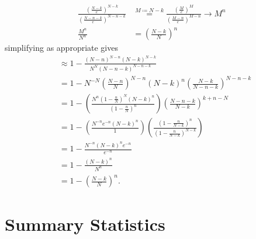\documentclass{article}
\theoremstyle{definition}
\begin{document}
\begin{align}
    \frac{\left(\frac{N-k}{e}\right)^{N-k}}{\left(\frac{N-n-k}{e}\right)^{N-n-k}}&\stackrel{M\coloneqq N-k}{=}\frac{\left(\frac{M}{e}\right)^{M}}{\left(\frac{M-n}{e}\right)^{M-n}}\to M^{n}\\
    \frac{M^{n}}{N^{n}}&=\left(\frac{N-k}{N}\right)^{n}
\end{align}
simplifying as appropriate gives
\begin{align}
    & \approx 1- \frac{\left(N-n\right)^{N-n}\left(N-k\right)^{N-k}}{N^{N}\left(N-n-k\right)^{N-n-k}}\\
    &= 1- N^{-N}\left(\frac{N-n}{N}\right)^{N-n}\left(N-k\right)^{n}\left(\frac{N-k}{N-n-k}\right)^{N-n-k}\\
    &=1-\left(\frac{N^{n}\left(1-\frac{n}{N}\right)^{N}\left(N-k\right)^{n}}{\left(1-\frac{n}{N}\right)^{n}}\right)\left(\frac{N-n-k}{N-k}\right)^{k+n-N}\\
    &=1-\left(\frac{N^{-n}e^{-n}\left(N-k\right)^{n}}{1}\right)\left(\frac{\left(1-\frac{n}{N-k}\right)^{n}}{\left(1-\frac{n}{N-k}\right)^{N-k}}\right)\\
    &=1-\frac{N^{-n}\left(N-k\right)^{n}e^{-n}}{e^{-n}}\\
    &=1-\frac{\left(N-k\right)^{n}}{N^{n}}\\
    &=1-\left(\frac{N-k}{N}\right)^{n}.
\end{align}
\section{Summary Statistics}
\end{document}
